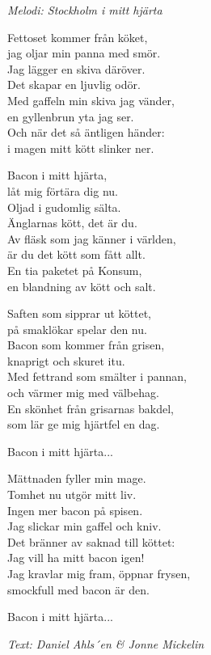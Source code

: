 {\footnotesize\textit{Melodi: Stockholm i mitt hjärta}}\par
\vspace{10pt}
Fettoset kommer från köket,\\
jag oljar min panna med smör.\\
Jag lägger en skiva däröver.\\
Det skapar en ljuvlig odör.\\
Med gaffeln min skiva jag vänder,\\
en gyllenbrun yta jag ser.\\
Och när det så äntligen händer:\\
i magen mitt kött slinker ner.\par
\vspace{10pt}
Bacon i mitt hjärta,\\
låt mig förtära dig nu.\\
Oljad i gudomlig sälta.\\
Änglarnas kött, det är du.\\
Av fläsk som jag känner i världen,\\
är du det kött som fått allt.\\
En tia paketet på Konsum,\\
en blandning av kött och salt.\par
\vspace{10pt}
Saften som sipprar ut köttet,\\
på smaklökar spelar den nu.\\
Bacon som kommer från grisen,\\
knaprigt och skuret itu.\\
Med fettrand som smälter i pannan,\\
och värmer mig med välbehag.\\
En skönhet från grisarnas bakdel,\\
som lär ge mig hjärtfel en dag.\par
\vspace{10pt}
Bacon i mitt hjärta...\par
\newpage
Mättnaden fyller min mage.\\
Tomhet nu utgör mitt liv.\\
Ingen mer bacon på spisen.\\
Jag slickar min gaffel och kniv.\\
Det bränner av saknad till köttet:\\
Jag vill ha mitt bacon igen!\\
Jag kravlar mig fram, öppnar frysen,\\
smockfull med bacon är den.\par
\vspace{10pt}
Bacon i mitt hjärta...\par
\vspace{10pt}
{\footnotesize\textit{Text: Daniel Ahls´{e}n \& Jonne Mickelin}}

